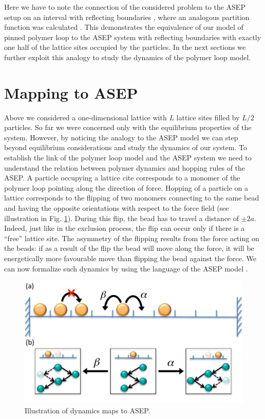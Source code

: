 \documentclass[aps,showpacs,twocolumn,floatfix,prx,superscriptaddress]{revtex4-1}
\begin{document}
Here we have to note the connection of the considered problem to the ASEP setup on an interval with reflecting boundaries \cite{}, where an analogous partition function was calculated \cite{}. This demonstrates the equivalence of our model of pinned polymer loop to the ASEP system with reflecting boundaries with exactly one half of the lattice sites occupied by the particles. In the next sections we further exploit this analogy to study the dynamics of the polymer loop model.

\section{Mapping to ASEP}\label{sec:asep}
Above we considered a one-dimensional lattice with $L$ lattice sites filled by
 $L/2$ particles. So far we were concerned only with the equilibrium properties
 of the system. However, by noticing the analogy to the ASEP model we can step
 beyond equilibrium considerations and study the dynamics of our system. To
 establish the link of the polymer loop model and the ASEP system we need to
 understand the relation between polymer dynamics and hopping rules of the ASEP.
 A particle occupying a lattice cite corresponds to a monomer of the polymer
 loop pointing along the direction of force. Hopping of a particle on a lattice
 corresponds to the flipping of two monomers connecting to the same bead and
 having the opposite orientations with respect to the force field (see
 illustration in Fig. \ref{fig:asep}). During this flip, the bead has to travel a distance of $\pm2a$. Indeed, just like in the exclusion process, the flip can occur only if there is a ``free'' lattice site. The asymmetry of the flipping results from the force acting on the beads: if as a result of the flip the bead will move along the force, it will be energetically more favourable move than flipping the bead against the force. We can now formalize such dynamics by using the language of the ASEP model \cite{Derrida1998,Schutz2001}. 
 \begin{figure}[htpb]
     \centering
     \includegraphics[width=1.0\linewidth]{asep}
     \caption{Illustration of dynamics maps to ASEP.}
     \label{fig:asep}
 \end{figure}
\end{document}
